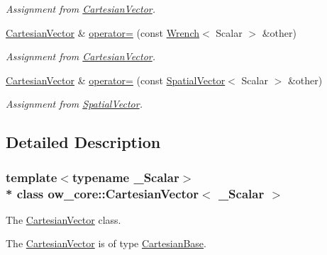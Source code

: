 \begin{DoxyCompactItemize}
\begin{DoxyCompactList}\small\item\em Assignment from \hyperlink{classow__core_1_1CartesianVector}{Cartesian\+Vector}. \end{DoxyCompactList}\item 
\hyperlink{classow__core_1_1CartesianVector}{Cartesian\+Vector} \& \hyperlink{classow__core_1_1CartesianVector_ab36bc2adab010c3f4a457d3f17d88349}{operator=} (const \hyperlink{classow__core_1_1Wrench}{Wrench}$<$ Scalar $>$ \&other)\hypertarget{classow__core_1_1CartesianVector_ab36bc2adab010c3f4a457d3f17d88349}{}\label{classow__core_1_1CartesianVector_ab36bc2adab010c3f4a457d3f17d88349}

\begin{DoxyCompactList}\small\item\em Assignment from \hyperlink{classow__core_1_1CartesianVector}{Cartesian\+Vector}. \end{DoxyCompactList}\item 
\hyperlink{classow__core_1_1CartesianVector}{Cartesian\+Vector} \& \hyperlink{classow__core_1_1CartesianVector_a6bd49c4253b17873919f4fd17b25e177}{operator=} (const \hyperlink{classow__core_1_1SpatialVector}{Spatial\+Vector}$<$ Scalar $>$ \&other)\hypertarget{classow__core_1_1CartesianVector_a6bd49c4253b17873919f4fd17b25e177}{}\label{classow__core_1_1CartesianVector_a6bd49c4253b17873919f4fd17b25e177}

\begin{DoxyCompactList}\small\item\em Assignment from \hyperlink{classow__core_1_1SpatialVector}{Spatial\+Vector}. \end{DoxyCompactList}\end{DoxyCompactItemize}


\subsection{Detailed Description}
\subsubsection*{template$<$typename \+\_\+\+Scalar$>$\\*
class ow\+\_\+core\+::\+Cartesian\+Vector$<$ \+\_\+\+Scalar $>$}

The \hyperlink{classow__core_1_1CartesianVector}{Cartesian\+Vector} class. 

The \hyperlink{classow__core_1_1CartesianVector}{Cartesian\+Vector} is of type \hyperlink{classow__core_1_1CartesianBase}{Cartesian\+Base}.

